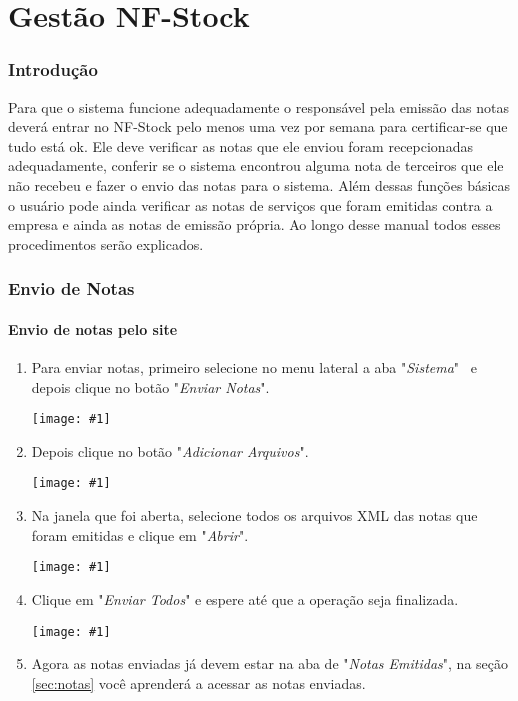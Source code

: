\documentclass{article}
\newcommand{\imagem}[2]{
  \begin{center}
    \texttt{[image: \#1]}
  \end{center}
}
\newcommand{\pretextual}{
  \cleardoublepage
  \pagenumbering{roman}
}
\newcommand{\textual}{
  \cleardoublepage
  \pagenumbering{arabic}
}
\newcommand{\parte}[1]{
  \pagebreak
  \vfill
  \partfont{\centering}
  \vspace*{\fill}
    \part{#1}    
  \vspace*{\fill}
  \vfill
  \pagebreak
}
\begin{document}
\singlespacing

\pretextual

\tableofcontents
\cleardoublepage

\textual

\parte{Gestão NF-Stock}
\section{Introdução}
\label{sec:intro}

Para que o sistema funcione adequadamente o responsável pela emissão das notas deverá entrar no NF-Stock pelo menos uma vez por semana para certificar-se que tudo está ok. Ele deve verificar as notas que ele enviou foram recepcionadas adequadamente, conferir se o sistema encontrou alguma nota de terceiros que ele não recebeu e fazer o envio das notas para o sistema. Além dessas funções básicas o usuário pode ainda verificar as notas de serviços que foram emitidas contra a empresa e ainda as notas de emissão própria. Ao longo desse manual todos esses procedimentos serão explicados.


\section{Envio de Notas}
\label{sec:envio-notas}

\subsection{Envio de notas pelo site}
\begin{enumerate}
  \item Para enviar notas, primeiro selecione no menu lateral a aba "\textit{Sistema}" \ e depois clique no botão "\textit{Enviar Notas}". \imagem{menu-sistema.PNG}{.4}
  \item Depois clique no botão "\textit{Adicionar Arquivos}". \imagem{botao-enviar.PNG}{.4}
  \pagebreak
  \item Na janela que foi aberta, selecione todos os arquivos XML das notas que foram emitidas e clique em "\textit{Abrir}". \imagem{selecionar-arquivos.PNG}{.6}
  \item Clique em "\textit{Enviar Todos}" e espere até que a operação seja finalizada. \imagem{enviar-todos.PNG}{.6}
  \item Agora as notas enviadas já devem estar na aba de "\textit{Notas Emitidas}", na seção \ref{sec:notas} você aprenderá a acessar as notas enviadas.
\end{enumerate}
\end{document}
